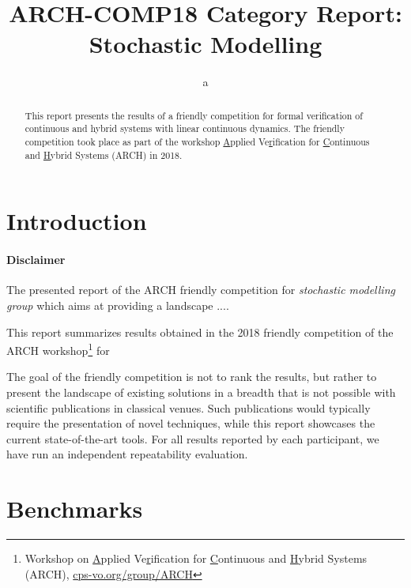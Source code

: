 \documentclass[EPiC]{easychair}
\title{ARCH-COMP18 Category Report:\\ Stochastic Modelling}
\author{ a
       \inst{1}
}
\institute{ a 
  \email{aa@email.com}}
\begin{document}
\maketitle

\begin{abstract}
This report presents the results of a friendly competition for formal verification of continuous and hybrid systems with linear continuous dynamics. The friendly competition took place as part of the workshop \underline{A}pplied Ve\underline{r}ification for \underline{C}ontinuous and \underline{H}ybrid Systems (ARCH) in 2018. 
\end{abstract}

\section{Introduction}
\label{sect:introduction}

\begin{framed}
\paragraph{Disclaimer} The presented report of the ARCH friendly competition for \textit{stochastic modelling group} which aims at providing a landscape ....
\end{framed}

This report summarizes results obtained in the 2018 friendly competition of the ARCH workshop\footnote{Workshop on \underline{A}pplied Ve\underline{r}ification for \underline{C}ontinuous and \underline{H}ybrid Systems (ARCH), \href{http://cps-vo.org/group/ARCH}{cps-vo.org/group/ARCH}} for 
 

The goal of the friendly competition is not to rank the results, but rather to present the landscape of existing solutions in a breadth that is not possible with scientific publications in classical venues. Such publications would typically require the presentation of novel techniques, while this report showcases the current state-of-the-art tools. For all results reported by each participant, we have run an independent repeatability evaluation. 


\section{Benchmarks}
\label{sec:benchmarks}
\end{document}

